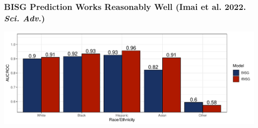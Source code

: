 \documentclass[handout]{beamer}
\begin{document}
\begin{frame}

  \frametitle{BISG Prediction Works Reasonably Well {\scriptsize (Imai
      et al. 2022. {\it Sci. Adv.})}}

  \includegraphics[width=\textwidth]{figs/AUCROC_Surnames.pdf}\\

\end{frame}
\end{document}
